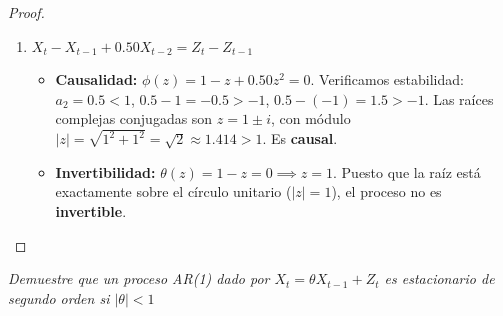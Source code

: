 \documentclass[11pt,letterpaper]{article}
\begin{document}
\begin{proof}
\begin{enumerate}
    \item $X_t - X_{t-1} + 0.50 X_{t-2} = Z_t - Z_{t-1}$
    \begin{itemize}
        \item \textbf{Causalidad:} $\phi(z) = 1 - z + 0.50z^2 = 0$.
        Verificamos estabilidad: $a_2 = 0.5 < 1$, $0.5 - 1 = -0.5 > -1$, $0.5 - (-1) = 1.5 > -1$. Las raíces complejas conjugadas son $z = 1 \pm i$, con módulo $|z| = \sqrt{1^2 + 1^2} = \sqrt{2} \approx 1.414 > 1$. Es \textbf{causal}.
        \item \textbf{Invertibilidad:} $\theta(z) = 1 - z = 0 \implies z = 1$.
        Puesto que la raíz está exactamente sobre el círculo unitario ($|z| = 1$), el proceso no es \textbf{invertible}.
    \end{itemize}
\end{enumerate}
\end{proof}
\begin{tcolorbox}[
	title = \textcolor{black}{\textcolor{white}{Problema 6}},]
\textit{Demuestre que un proceso AR(1) dado por $X_t=\theta X_{t-1}+Z_{t}$ es estacionario de segundo orden si $|\theta|<1$}
\end{tcolorbox}
\end{document}
